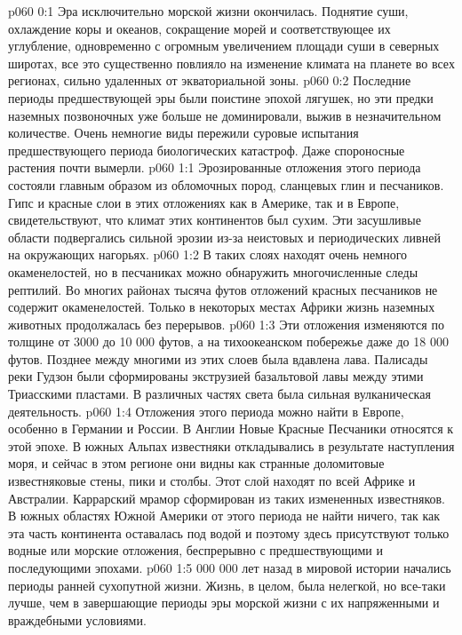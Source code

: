 \author{Носитель Жизни}
\vs p060 0:1 Эра исключительно морской жизни окончилась. Поднятие суши, охлаждение коры и океанов, сокращение морей и соответствующее их углубление, одновременно с огромным увеличением площади суши в северных широтах, все это существенно повлияло на изменение климата на планете во всех регионах, сильно удаленных от экваториальной зоны.
\vs p060 0:2 Последние периоды предшествующей эры были поистине эпохой лягушек, но эти предки наземных позвоночных уже больше не доминировали, выжив в незначительном количестве. Очень немногие виды пережили суровые испытания предшествующего периода биологических катастроф. Даже спороносные растения почти вымерли.
\vs p060 1:1 Эрозированные отложения этого периода состояли главным образом из обломочных пород, сланцевых глин и песчаников. Гипс и красные слои в этих отложениях как в Америке, так и в Европе, свидетельствуют, что климат этих континентов был сухим. Эти засушливые области подвергались сильной эрозии из\hyp{}за неистовых и периодических ливней на окружающих нагорьях.
\vs p060 1:2 В таких слоях находят очень немного окаменелостей, но в песчаниках можно обнаружить многочисленные следы рептилий. Во многих районах тысяча футов отложений красных песчаников не содержит окаменелостей. Только в некоторых местах Африки жизнь наземных животных продолжалась без перерывов.
\vs p060 1:3 Эти отложения изменяются по толщине от 3000 до 10 000 футов, а на тихоокеанском побережье даже до 18 000 футов. Позднее между многими из этих слоев была вдавлена лава. Палисады реки Гудзон были сформированы экструзией базальтовой лавы между этими Триасскими пластами. В различных частях света была сильная вулканическая деятельность.
\vs p060 1:4 Отложения этого периода можно найти в Европе, особенно в Германии и России. В Англии Новые Красные Песчаники относятся к этой эпохе. В южных Альпах известняки откладывались в результате наступления моря, и сейчас в этом регионе они видны как странные доломитовые известняковые стены, пики и столбы. Этот слой находят по всей Африке и Австралии. Каррарский мрамор сформирован из таких измененных известняков. В южных областях Южной Америки от этого периода не найти ничего, так как эта часть континента оставалась под водой и поэтому здесь присутствуют только водные или морские отложения, беспрерывно с предшествующими и последующими эпохами.
\vs p060 1:5  000 000 лет назад в мировой истории начались периоды ранней сухопутной жизни. Жизнь, в целом, была нелегкой, но все\hyp{}таки лучше, чем в завершающие периоды эры морской жизни с их напряженными и враждебными условиями.
